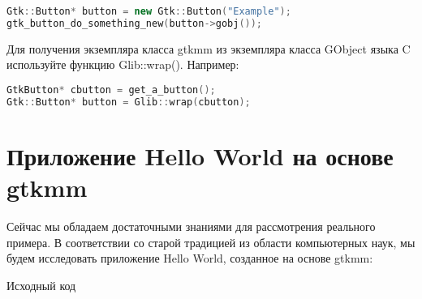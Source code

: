 \begin{lstlisting}[language=C++]
Gtk::Button* button = new Gtk::Button("Example");
gtk_button_do_something_new(button->gobj());
\end{lstlisting}

Для получения экземпляра класса gtkmm из экземпляра класса GObject языка C используйте функцию Glib::wrap(). Например:

\begin{lstlisting}[language=C++]
GtkButton* cbutton = get_a_button();
Gtk::Button* button = Glib::wrap(cbutton);
\end{lstlisting}

\section{Приложение Hello World на основе gtkmm}
 Сейчас мы обладаем достаточными знаниями для рассмотрения реального примера. В соответствии со старой традицией из области компьютерных наук, мы будем исследовать приложение Hello World, созданное на основе gtkmm:

Исходный код

